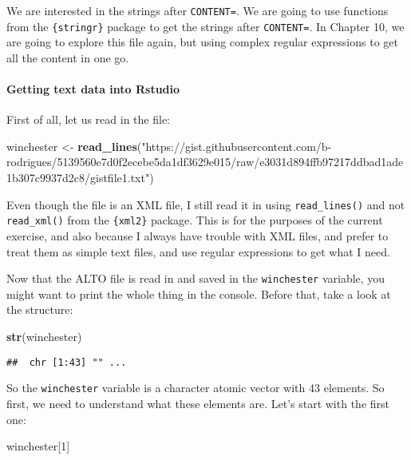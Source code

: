 \documentclass[
]{article}
\newenvironment{Shaded}{\begin{snugshade}}{\end{snugshade}}
\newcommand{\DecValTok}[1]{\textcolor[rgb]{0.00,0.00,0.81}{#1}}
\newcommand{\KeywordTok}[1]{\textcolor[rgb]{0.13,0.29,0.53}{\textbf{#1}}}
\newcommand{\NormalTok}[1]{#1}
\newcommand{\StringTok}[1]{\textcolor[rgb]{0.31,0.60,0.02}{#1}}
\begin{document}
We are interested in the strings after \texttt{CONTENT=}. We are going to use functions from the \texttt{\{stringr\}}
package to get the strings after \texttt{CONTENT=}. In Chapter 10, we are going to explore this file
again, but using complex regular expressions to get all the content in one go.

\hypertarget{getting-text-data-into-rstudio}{%
\paragraph{Getting text data into Rstudio}\label{getting-text-data-into-rstudio}}

First of all, let us read in the file:

\begin{Shaded}
\begin{Highlighting}[]
\NormalTok{winchester \textless{}{-}}\StringTok{ }\KeywordTok{read\_lines}\NormalTok{(}\StringTok{"https://gist.githubusercontent.com/b{-}rodrigues/5139560e7d0f2ecebe5da1df3629e015/raw/e3031d894ffb97217ddbad1ade1b307c9937d2c8/gistfile1.txt"}\NormalTok{)}
\end{Highlighting}
\end{Shaded}

Even though the file is an XML file, I still read it in using \texttt{read\_lines()} and not \texttt{read\_xml()}
from the \texttt{\{xml2\}} package. This is for the purposes of the current exercise, and also because I
always have trouble with XML files, and prefer to treat them as simple text files, and use regular
expressions to get what I need.

Now that the ALTO file is read in and saved in the \texttt{winchester} variable, you might want to print
the whole thing in the console. Before that, take a look at the structure:

\begin{Shaded}
\begin{Highlighting}[]
\KeywordTok{str}\NormalTok{(winchester)}
\end{Highlighting}
\end{Shaded}

\begin{verbatim}
##  chr [1:43] "" ...
\end{verbatim}

So the \texttt{winchester} variable is a character atomic vector with 43 elements. So first, we need to
understand what these elements are. Let's start with the first one:

\begin{Shaded}
\begin{Highlighting}[]
\NormalTok{winchester[}\DecValTok{1}\NormalTok{]}
\end{Highlighting}
\end{Shaded}
\end{document}
